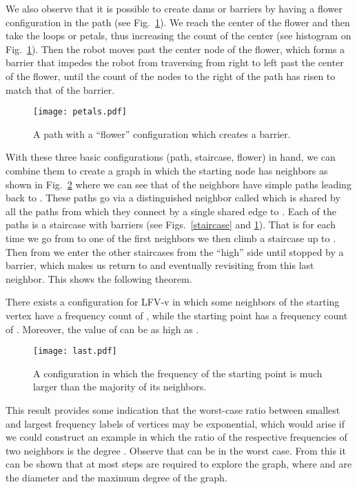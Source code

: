 We also observe that it is possible to create dams or barriers by having a
flower configuration  in the path (see Fig.~\ref{petals}). We reach
the center of the flower and then take the loops or petals, thus increasing the
count of the center (see histogram on Fig.~\ref{petals}).
Then the robot moves past the center node of the flower, which forms
a barrier that impedes the robot from traversing from right to left past the
center of the flower, until the count of the nodes to the right of the path has
risen to match that of the barrier.
\begin{figure}\centering
 \texttt{[image: petals.pdf]}
\caption{A path with a ``flower'' configuration which creates a barrier.} \label{petals}
 \end{figure}
With these three basic configurations (path, staircase, flower) in hand, we can combine them to create a
graph in which the starting node  has  neighbors as shown in Fig.~\ref{freq}
where we can see that of the  neighbors  have simple paths
leading back to . These paths go via a distinguished neighbor called 
which is shared by all the paths from which they connect by a single shared edge to .
Each of the paths is a staircase with barriers (see Figs.~\ref{staircase} and \ref{petals}).
That is for each time we go from  to one of the first  neighbors
we then climb a staircase up to . Then from  we enter the other
staircases from the ``high'' side until stopped
by a barrier, which makes us return to  and eventually
revisiting  from this last neighbor. This shows the following theorem.

\begin{theorem}
\label{th:ratio}
There exists a configuration for LFV-v in which some neighbors of the starting
vertex have a frequency count of , while the starting point has
a frequency count of . Moreover, the value of  can be as high
as .
\end{theorem}
\begin{figure}\centering
 \texttt{[image: last.pdf]}
\caption{A configuration in which the frequency of the starting point  is
much larger than the majority of its neighbors.  } \label{freq}
 \end{figure}
This result provides some indication that the worst-case ratio between
smallest and largest frequency labels of vertices may be exponential,
which would arise if we could construct an example in which the ratio of the
respective frequencies of two neighbors is the degree . Observe that 
can be  in the worst case.
From this it can be shown that at most  steps are required to explore the graph,
where  and  are the diameter and the maximum degree of the graph.

